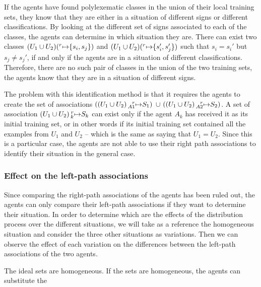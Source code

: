 If the agents have found polylexematic classes in the union of their local training sets, they know that they are either in a situation of different signs or different classifications. By looking at the different set of signs associated to each of the classes, the agents can determine in which situation they are. There can exist two classes $(U_{1} \cup U_{2})(\prescript{r}{}{\mapsto} \{s_{i},s_{j}\})$ and  $(U_{1} \cup U_{2})(\prescript{r}{}{\mapsto} \{s_{i}',s_{j}'\})$ such that $s_{i} = s_{i}'$ but $s_{j} \neq s_{j}'$, if and only if the agents are in a situation of different classifications. Therefore, there are no such pair of classes in the union of the two training sets, the agents know that they are in a situation of different signs.

The problem with this identification method is that it requires the agents to create the set of associations $((U_{1} \cup U_{2}) \prescript{r}{A1}{\mapsto} S_{1})$ $\cup$ $((U_{1} \cup U_{2}) \prescript{r}{A2}{\mapsto} S_{2})$. A set of association $(U_{1} \cup U_{2}) \prescript{r}{k}{\mapsto} S_{k}$ can exist only if the agent $A_{k}$ has received it as its initial training set, or in other words if its initial training set contained all the examples from $U_{1}$ and $U_{2}$ -- which is the same as saying that $U_{1} = U_{2}$. Since this is a particular case, the agents are not able to use their right path associations to identify their situation in the general case.

\subsubsection{Effect on the left-path associations}

Since comparing the right-path associations of the agents has been ruled out, the agents can only compare their left-path associations if they want to determine their situation. In order to determine which are the effects of the distribution process over the different situations, we will take as a reference the homogeneous situation and consider the three other situations as variations. Then we can observe the effect of each variation on the differences between the left-path associations of the two agents.

The ideal sets are homogeneous. If the sets are homogeneous, the agents can substitute the 

